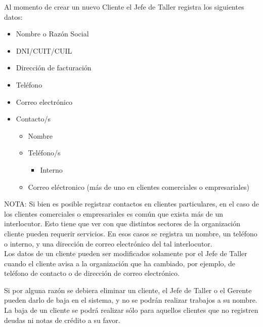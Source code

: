 \documentclass[12pt]{extarticle}
\begin{document}
\begin{spacing}{1.2}
    Al momento de crear un nuevo Cliente el Jefe de Taller registra los siguientes datos:
    \begin{itemize}
        \item Nombre o Razón Social
        \item DNI/CUIT/CUIL
        \item Dirección de facturación
        \item Teléfono
        \item Correo electrónico
        \item Contacto/s
        	\begin{itemize}
				\item Nombre	
		        \item Teléfono/s
		        \begin{itemize}
			        \item Interno	        
		        \end{itemize}
		        \item Correo eléctronico (más de uno en clientes comerciales o empresariales)\\        	
        	\end{itemize}
    \end{itemize}

        NOTA: Si bien es posible registrar contactos en clientes particulares, en el caso de los clientes comerciales o empresariales es común que exista más de un interlocutor. Esto tiene que ver con que distintos sectores de la organización cliente pueden requerir servicios. En esos casos se registra un nombre, un teléfono o interno, y una dirección de correo electrónico del tal interlocutor. \\

    Los datos de un cliente pueden ser modificados solamente por el Jefe de Taller cuando el cliente avisa a la organización que ha cambiado, por ejemplo, de teléfono de contacto o de dirección de correo electrónico.

    Si por alguna razón se debiera eliminar un cliente, el Jefe de Taller o el Gerente pueden darlo de baja en el sistema, y no se podrán realizar trabajos a su nombre. La baja de un cliente se podrá realizar sólo para aquellos clientes que no registren deudas ni notas de crédito a su favor.
    

\end{spacing}
\end{document}
